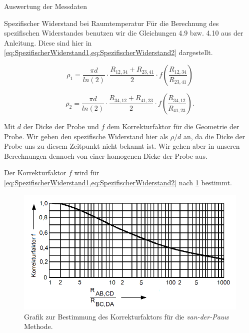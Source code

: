 \documentclass[pdftex, a4paper,11pt, twoside, ngerman]{report}
\begin{document}
\begin{chapter}{Auswertung der Messdaten}
\begin{section}{Spezifischer Widerstand bei Raumtemperatur}
      Für die Berechnung des spezifischen Widerstandes benutzen wir die
      Gleichungen 4.9 bzw. 4.10 aus der Anleitung.
      Diese sind hier in
      \cref{eq:SpezifischerWiderstand1,eq:SpezifischerWiderstand2} dargestellt.
      
      \begin{equation}
        \label{eq:SpezifischerWiderstand1}
        \rho_{1} = \frac{\pi d}{ln(2)}\cdot
        \frac{R_{12,34}+R_{23,41}}{2}
        \cdot f\left(\frac{R_{12,34}}{R_{23,41}} \right)
      \end{equation}
      
      \begin{equation}
        \label{eq:SpezifischerWiderstand2}
        \rho_{2} = \frac{\pi d}{ln(2)}\cdot
        \frac{R_{34,12}+R_{41,23}}{2}
        \cdot f\left(\frac{R_{34,12}}{R_{41,23}} \right).
      \end{equation}
      
      Mit $d$ der Dicke der Probe und $f$ dem Korrekturfaktor für die Geometrie
      der Probe.
      Wir geben den spezifische Widerstand hier als $\rho/d$ an, da die Dicke
      der Probe uns zu diesem Zeitpunkt nicht bekannt ist.
      Wir gehen aber in unseren Berechnungen dennoch von einer homogenen Dicke
      der Probe aus.
      
      Der Korrekturfaktor $f$ wird für
      \cref{eq:SpezifischerWiderstand1,eq:SpezifischerWiderstand2} nach
      \cref{fig:Korrekturfaktor} bestimmt.
      \begin{figure}[htbp]
        \centering
        \includegraphics[width=\textwidth]{Figures/Korrekturfaktor.png}
        \caption{Grafik zur Bestimmung des Korrekturfaktors für die
            \textit{van-der-Pauw} Methode.\cite{bib:Anleitung}}
        \label{fig:Korrekturfaktor}
      \end{figure}
      

\end{section}
\end{chapter}
\end{document}

